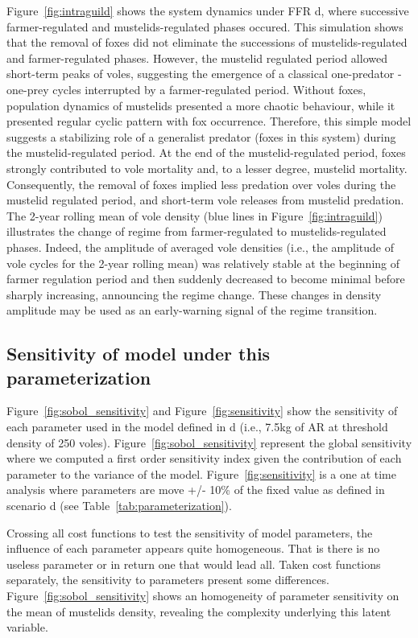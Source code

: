 \documentclass[11pt]{article}
\begin{document}
Figure~\ref{fig:intraguild} shows the system dynamics under FFR d, where successive farmer-regulated and mustelids-regulated phases occured. This simulation shows that the removal of foxes did not eliminate the successions of mustelids-regulated and farmer-regulated phases. However, the mustelid regulated period allowed short-term peaks of voles, suggesting the emergence of a classical one-predator - one-prey cycles interrupted by a farmer-regulated period. Without foxes, population dynamics of mustelids presented a more chaotic behaviour, while it presented regular cyclic pattern with fox occurrence. Therefore, this simple model suggests a stabilizing role of a generalist predator (foxes in this system) during the mustelid-regulated period. At the end of the mustelid-regulated period, foxes strongly contributed to vole mortality and, to a lesser degree, mustelid mortality. Consequently, the removal of foxes implied less predation over voles during the mustelid regulated period, and short-term vole releases from mustelid predation. The 2-year rolling mean of vole density (blue lines in Figure~\ref{fig:intraguild}) illustrates the change of regime from farmer-regulated to mustelids-regulated phases. Indeed, the amplitude of averaged vole densities (i.e., the amplitude of vole cycles for the 2-year rolling mean) was relatively stable at the beginning of farmer regulation period and then suddenly decreased to become minimal before sharply increasing, announcing the regime change. These changes in density amplitude may be used as an early-warning signal of the regime transition. 

\subsection{Sensitivity of model under this parameterization}

Figure~\ref{fig:sobol_sensitivity} and Figure~\ref{fig:sensitivity} show the sensitivity of each parameter used in the model defined in d (i.e., 7.5kg of AR at threshold density of 250 voles).
%
Figure~\ref{fig:sobol_sensitivity} represent the global sensitivity where we computed a first order sensitivity index \citep{Sobol1993, Saltelli2019} given the contribution of each parameter to the variance of the model.
%
Figure~\ref{fig:sensitivity} is a one at time analysis \citep{Saltelli2019} where parameters are move +/- 10\% of the fixed value as defined in scenario d (see Table~\ref{tab:parameterization}).

Crossing all cost functions to test the sensitivity of model parameters, the influence of each parameter appears quite homogeneous. That is there is no useless parameter or in return one that would lead all.
%
Taken cost functions separately, the sensitivity to parameters present some differences.
%
Figure~\ref{fig:sobol_sensitivity} shows an homogeneity of parameter sensitivity on the mean of mustelids density, revealing the complexity underlying this latent variable.
\end{document}
